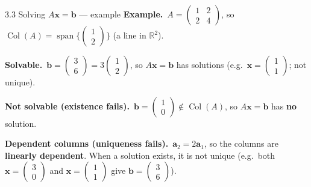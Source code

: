 \documentclass[11pt,aspectratio=169]{beamer}
\begin{document}
\begin{frame}{3.3 Solving $A\mathbf{x}=\mathbf{b}$ --- example}
  \footnotesize
  \textbf{Example.}\
  $A=\begin{pmatrix}1&2\\ 2&4\end{pmatrix}$, so
  $\operatorname{Col}(A)=\operatorname{span}\bigl\{\begin{pmatrix}1\\ 2\end{pmatrix}\bigr\}$
  (a line in $\mathbb{R}^2$).

  \medskip
  \textbf{Solvable.}\
  $\mathbf{b}=\begin{pmatrix}3\\ 6\end{pmatrix}=3\begin{pmatrix}1\\ 2\end{pmatrix}$, so
  $A\mathbf{x}=\mathbf{b}$ has solutions
  (e.g.\ $\mathbf{x}=\begin{pmatrix}1\\ 1\end{pmatrix}$; not unique).

  \medskip
  \textbf{Not solvable (existence fails).}\
  $\mathbf{b}=\begin{pmatrix}1\\ 0\end{pmatrix}\notin\operatorname{Col}(A)$, so
  $A\mathbf{x}=\mathbf{b}$ has \textbf{no} solution.

  \medskip
  \textbf{Dependent columns (uniqueness fails).}\
  $\mathbf{a}_2=2\mathbf{a}_1$, so the columns are \textbf{linearly dependent}.
  When a solution exists, it is not unique
  (e.g.\ both $\mathbf{x}=\begin{pmatrix}3\\ 0\end{pmatrix}$ and
  $\mathbf{x}=\begin{pmatrix}1\\ 1\end{pmatrix}$ give
  $\mathbf{b}=\begin{pmatrix}3\\ 6\end{pmatrix}$).
\end{frame}
\end{document}
